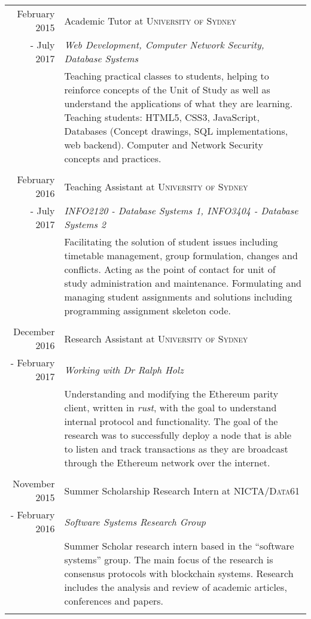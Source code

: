 \documentclass[10pt]{article}
\begin{document}
\begin{tabular}{r|p{11cm}}
February 2015 & Academic Tutor at \textsc{University of Sydney} \\ - July 2017 & \emph{Web Development, Computer Network Security, Database Systems %
}\\&\footnotesize{Teaching practical classes to students, helping to reinforce concepts of the Unit of Study as well as understand the applications of what they are learning. Teaching students: HTML5, CSS3, JavaScript, Databases (Concept drawings, SQL implementations, web backend). Computer and Network Security concepts and practices.}\\\multicolumn{2}{c}{} \\
February 2016 & Teaching Assistant at
\textsc{University of Sydney} \\ - July 2017
&\emph{INFO2120 - Database Systems 1, INFO3404 -
Database Systems 2}\\&\footnotesize{Facilitating the solution of student issues including timetable management, group formulation, changes and conflicts. Acting as the point of contact for unit of study administration and maintenance. Formulating and managing student assignments and solutions including programming assignment skeleton code.}\\\multicolumn{2}{c}{} \\
December 2016 & Research Assistant at \textsc{University of Sydney} \\ - February 2017 & \emph{Working with Dr Ralph Holz}\\ & \footnotesize{Understanding and modifying the Ethereum parity client, written in \emph{rust}, with the goal to understand internal protocol and functionality. The goal of the research was to successfully deploy a node that is able to listen and track transactions as they are broadcast through the Ethereum network over the internet.}\\\multicolumn{2}{c}{} \\
November 2015 & Summer Scholarship Research Intern at \textsc{NICTA/Data61} \\ - February 2016 & \emph{Software Systems Research Group}\\&\footnotesize{Summer Scholar research intern based in the ``software systems'' group. The main focus of the research is consensus protocols with blockchain systems. Research includes the analysis and review of academic articles, conferences and papers. }\\\multicolumn{2}{c}{}\\

\end{tabular}
\end{document}
